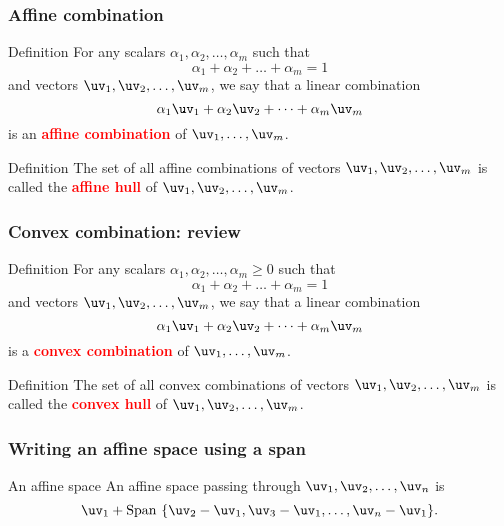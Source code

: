 \begin{frame}
  \frametitle{Affine combination}
  
  \begin{block}{Definition}
    For any scalars $\alpha_1,\alpha_2,\ldots,\alpha_m$
    such that 
    \[
    \alpha_1 + \alpha_2 + \ldots + \alpha_m = 1
    \]
    and vectors $\uv_1,\uv_2,\ldots,\uv_m$, we say that a linear combination
    \[
    \alpha_1\uv_1 + \alpha_2\uv_2 + \cdots + \alpha_m \uv_m
    \]
    is an \textcolor{red}{\bf affine combination} of $\uv_1,\ldots,\uv_m$.
  \end{block}

  \pause

  \begin{block}{Definition}
    The set of all affine combinations of 
    vectors $\uv_1,\uv_2,\ldots,\uv_m$
    is called the \textcolor{red}{\bf affine hull} of
    $\uv_1,\uv_2,\ldots,\uv_m$.
  \end{block}

\end{frame}

\begin{frame}
  \frametitle{Convex combination: review}
  
  \begin{block}{Definition}
    For any scalars $\alpha_1,\alpha_2,\ldots,\alpha_m \geq 0$
    such that 
    \[
    \alpha_1 + \alpha_2 + \ldots + \alpha_m = 1
    \]
    and vectors $\uv_1,\uv_2,\ldots,\uv_m$, we say that a linear combination
    \[
    \alpha_1\uv_1 + \alpha_2\uv_2 + \cdots + \alpha_m \uv_m
    \]
    is a \textcolor{red}{\bf convex combination} of $\uv_1,\ldots,\uv_m$.
  \end{block}

  \begin{block}{Definition}
    The set of all convex combinations of 
    vectors $\uv_1,\uv_2,\ldots,\uv_m$
    is called the \textcolor{red}{\bf convex hull} of
    $\uv_1,\uv_2,\ldots,\uv_m$.
  \end{block}

\end{frame}

\begin{frame}
  \frametitle{Writing an affine space using a span}
  \pause

  \begin{block}{An affine space}
    An affine space passing through $\uv_1,\uv_2,\ldots,\uv_n$ is
    \[
    \uv_1 + \mathrm{Span}\ \{\uv_2-\uv_1,\uv_3-\uv_1,\ldots,\uv_n-\uv_1\}.
    \]
  \end{block}
\end{frame}

